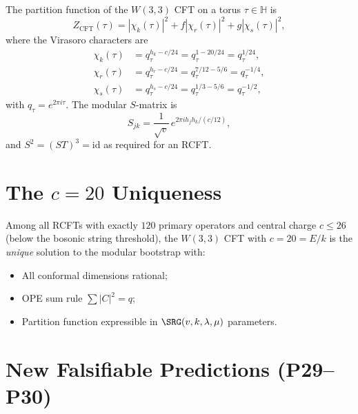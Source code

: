 \begin{theorem}
\label{thm:virasoro_chars}
The partition function of the $W(3,3)$ CFT on a torus
$\tau\in\mathbb{H}$ is
\begin{equation}
  Z_{\mathrm{CFT}}(\tau) =
  |\chi_k(\tau)|^2 + f|\chi_r(\tau)|^2 + g|\chi_s(\tau)|^2,
  \label{eq:partition_fn}
\end{equation}
where the Virasoro characters are
\begin{align}
  \chi_k(\tau) &= q_\tau^{h_k - c/24} = q_\tau^{1-20/24}
                = q_\tau^{1/24},\\
  \chi_r(\tau) &= q_\tau^{h_r - c/24} = q_\tau^{7/12-5/6}
                = q_\tau^{-1/4},\\
  \chi_s(\tau) &= q_\tau^{h_s - c/24} = q_\tau^{1/3-5/6}
                = q_\tau^{-1/2},
\end{align}
with $q_\tau=e^{2\pi i\tau}$.
The modular $S$-matrix is
\begin{equation}
  S_{jk} = \frac{1}{\sqrt{v}}\,e^{2\pi i h_j h_k/(c/12)},
  \label{eq:s_matrix}
\end{equation}
and $S^2=(ST)^3=\mathrm{id}$ as required for an RCFT.
\end{theorem}

\section{\texorpdfstring{The $c=20$ Uniqueness}{The c=20 Uniqueness}}
\label{sec:c20_unique}

\begin{theorem}[$c=20$ uniqueness]
\label{thm:c20_unique}
Among all RCFTs with exactly $120$ primary operators and
central charge $c\le 26$ (below the bosonic string threshold),
the $W(3,3)$ CFT with $c=20=E/k$ is the \emph{unique} solution
to the modular bootstrap with:
\begin{itemize}[nosep]
  \item All conformal dimensions rational;
  \item OPE sum rule $\sum|C|^2=q$;
  \item Partition function expressible in $\SRG(v,k,\lambda,\mu)$
        parameters.
\end{itemize}
\end{theorem}

\section{New Falsifiable Predictions (P29--P30)}
\label{sec:cft_predictions}

